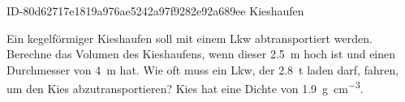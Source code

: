 \begin{exercise}
      {ID-80d62717e1819a976ae5242a97f9282e92a689ee}
      {Kieshaufen}
  \ifproblem\problem\par
    Ein kegelförmiger Kieshaufen soll mit einem
    Lkw abtransportiert werden. Berechne das
    Volumen des Kieshaufens, wenn dieser
    \SI{2.5}{\metre}
    hoch ist und einen Durchmesser von
    \SI{4}{\metre}
    hat. Wie oft muss ein Lkw, der
    \SI{2.8}{\tonne}
    laden darf, fahren, um den Kies abzutransportieren?
    Kies hat eine Dichte von \SI{1.9}{\gram\per\cubic\centi\metre}.
  \fi
\end{exercise}
